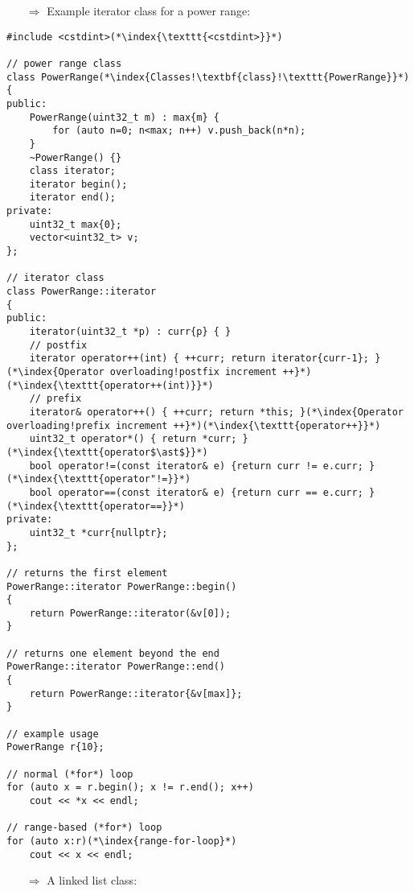 \documentclass[10pt]{article}
\begin{document}
\begin{enumerate}
\item[$\Rightarrow$] Example iterator class for a power range:
\end{enumerate}
\begin{lstlisting}
#include <cstdint>(*\index{\texttt{<cstdint>}}*)

// power range class
class PowerRange(*\index{Classes!\textbf{class}!\texttt{PowerRange}}*)
{
public:
    PowerRange(uint32_t m) : max{m} {
        for (auto n=0; n<max; n++) v.push_back(n*n);
    }
    ~PowerRange() {}
    class iterator;
    iterator begin();
    iterator end();
private:
    uint32_t max{0};
    vector<uint32_t> v;
};

// iterator class
class PowerRange::iterator
{
public:
    iterator(uint32_t *p) : curr{p} { }
    // postfix
    iterator operator++(int) { ++curr; return iterator{curr-1}; }(*\index{Operator overloading!postfix increment ++}*)(*\index{\texttt{operator++(int)}}*)
    // prefix
    iterator& operator++() { ++curr; return *this; }(*\index{Operator overloading!prefix increment ++}*)(*\index{\texttt{operator++}}*)
    uint32_t operator*() { return *curr; }(*\index{\texttt{operator$\ast$}}*)
    bool operator!=(const iterator& e) {return curr != e.curr; }(*\index{\texttt{operator"!=}}*)
    bool operator==(const iterator& e) {return curr == e.curr; }(*\index{\texttt{operator==}}*)
private:
    uint32_t *curr{nullptr};
};

// returns the first element
PowerRange::iterator PowerRange::begin()
{
    return PowerRange::iterator(&v[0]);
}

// returns one element beyond the end
PowerRange::iterator PowerRange::end()
{
    return PowerRange::iterator{&v[max]};
}

// example usage
PowerRange r{10};
    
// normal (*for*) loop
for (auto x = r.begin(); x != r.end(); x++)
    cout << *x << endl;

// range-based (*for*) loop
for (auto x:r)(*\index{range-for-loop}*)
    cout << x << endl;
\end{lstlisting}
\begin{enumerate}
\item[$\Rightarrow$] A linked list class:
\end{enumerate}
\end{document}
